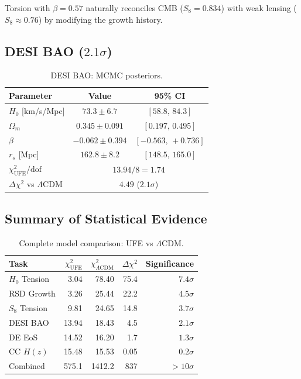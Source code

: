 \documentclass[twocolumn,prd,superscriptaddress,nofootinbib]{revtex4-2}
\begin{document}
Torsion with $\beta = 0.57$ naturally reconciles CMB ($S_8 = 0.834$) with weak lensing ($S_8 \approx 0.76$) by modifying the growth history.

\subsection{DESI BAO ($2.1\sigma$)}

\begin{table}[h]
\caption{DESI BAO: MCMC posteriors.}
\begin{ruledtabular}
\begin{tabular}{lcc}
Parameter & Value & 95\% CI \\
\hline
$H_0$ [km/s/Mpc] & $73.3 \pm 6.7$ & $[58.8,\, 84.3]$ \\
$\Omega_m$ & $0.345 \pm 0.091$ & $[0.197,\, 0.495]$ \\
$\beta$ & $-0.062 \pm 0.394$ & $[-0.563,\, +0.736]$ \\
$r_s$ [Mpc] & $162.8 \pm 8.2$ & $[148.5,\, 165.0]$ \\
\hline
$\chi^2_\text{UFE}/\text{dof}$ & \multicolumn{2}{c}{$13.94/8 = 1.74$} \\
$\Delta\chi^2$ vs $\Lambda$CDM & \multicolumn{2}{c}{$4.49$ ($2.1\sigma$)} \\
\end{tabular}
\end{ruledtabular}
\end{table}

\subsection{Summary of Statistical Evidence}

\begin{table}[h]
\caption{Complete model comparison: UFE vs $\Lambda$CDM.}
\label{tab:summary}
\begin{ruledtabular}
\begin{tabular}{lrrrr}
Task & $\chi^2_\text{UFE}$ & $\chi^2_{\Lambda\text{CDM}}$ & $\Delta\chi^2$ & Significance \\
\hline
$H_0$ Tension & 3.04 & 78.40 & 75.4 & $7.4\sigma$ \\
RSD Growth & 3.26 & 25.44 & 22.2 & $4.5\sigma$ \\
$S_8$ Tension & 9.81 & 24.65 & 14.8 & $3.7\sigma$ \\
DESI BAO & 13.94 & 18.43 & 4.5 & $2.1\sigma$ \\
DE EoS & 14.52 & 16.20 & 1.7 & $1.3\sigma$ \\
CC $H(z)$ & 15.48 & 15.53 & 0.05 & $0.2\sigma$ \\
Combined & 575.1 & 1412.2 & 837 & $>10\sigma$ \\
\end{tabular}
\end{ruledtabular}
\end{table}
\end{document}

